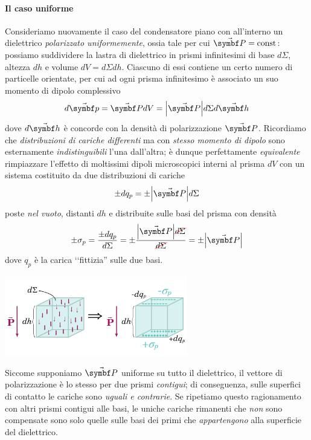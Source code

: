 \paragraph{Il caso uniforme}
Consideriamo nuovamente il caso del condensatore piano con all'interno un dielettrico \textit{polarizzato uniformemente}, ossia tale per cui $\vba{P}=\text{const}$: possiamo suddividere la lastra di dielettrico in prismi infinitesimi di base $d\Sigma$, altezza $dh$ e volume $dV=d\Sigma dh$. Ciascuno di essi contiene un certo numero di particelle orientate, per cui ad ogni prisma infinitesimo è associato un suo momento di dipolo complessivo
\begin{equation*}
	d\vba{p}=\vba{P}dV=\abs{\vba{P}}d\Sigma d\vba{h}
\end{equation*}
dove $d\vba{h}$ è concorde con la densità di polarizzazione $\vba{P}$. Ricordiamo che \textit{distribuzioni di cariche differenti} ma con \textit{stesso momento di dipolo} sono esternamente \textit{indistinguibili} l'una dall'altra; è dunque perfettamente \textit{equivalente} rimpiazzare l'effetto di moltissimi dipoli microscopici interni al prisma $dV$ con un sistema costituito da due distribuzioni di cariche
\begin{equation*}
	\pm dq_p=\pm \abs{\vba{P}}d\Sigma
\end{equation*}
poste \textit{nel vuoto}, distanti $dh$ e distribuite sulle basi del prisma con densità
\begin{equation*}
	\pm\sigma_p=\frac{\pm dq_p}{d\Sigma}=\pm\frac{\abs{\vba{P}}\Ccancel[red]{d\Sigma}}{\Ccancel[red]{d\Sigma}}=\pm\abs{\vba{P}}
\end{equation*}
dove $q_p$ è la carica ‘‘fittizia'' sulle due basi.
\begin{center}
	\includegraphics[width=0.6\textwidth]{images/chp6/chp6caricapolari1.pdf}
\end{center}
Siccome supponiamo $\vba{P}$ uniforme su tutto il dielettrico, il vettore di polarizzazione è lo stesso per due prismi \textit{contigui}; di conseguenza, sulle superfici di contatto le cariche sono \textit{uguali e contrarie}. Se ripetiamo questo ragionamento con altri prismi contigui alle basi, le uniche cariche rimanenti che \textit{non} sono compensate sono solo quelle sulle basi dei primi che \textit{appartengono} alla superficie del dielettrico.
